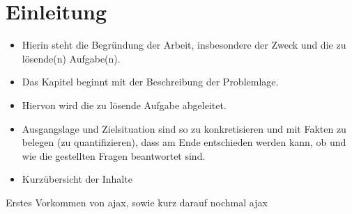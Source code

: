 
\chapter{Einleitung}

\label{Chapter1}

\begin{itemize}
  \item Hierin steht die Begründung der Arbeit, insbesondere der Zweck und die zu lösende(n) Aufgabe(n).
  \item Das Kapitel beginnt mit der Beschreibung der Problemlage.
  \item Hiervon wird die zu lösende Aufgabe abgeleitet.
  \item Ausgangslage und Zielsituation sind so zu konkretisieren und mit Fakten zu belegen (zu quantifizieren), dass am Ende entschieden werden kann, ob und wie die gestellten Fragen beantwortet sind.
  \item Kurzübersicht der Inhalte
\end{itemize}

Erstes Vorkommen von \ac{ajax}, sowie kurz darauf nochmal \ac{ajax}